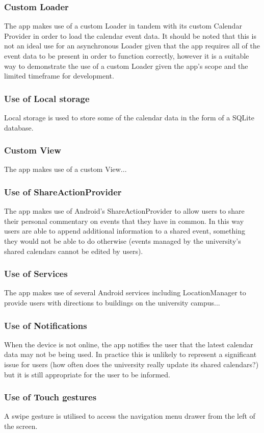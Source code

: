 \documentclass{article}
\begin{document}
\subsubsection{Custom Loader}
The app makes use of a custom Loader in tandem with its custom Calendar Provider in order to load the calendar event data. It should be noted that this is not an ideal use for an asynchronous Loader given that the app requires all of the event data to be present in order to function correctly, however it is a suitable way to demonstrate the use of a custom Loader given the app's scope and the limited timeframe for development.
\subsubsection{Use of Local storage}
Local storage is used to store some of the calendar data in the form of a SQLite database.
\subsubsection{Custom View}
The app makes use of a custom View...
\subsubsection{Use of ShareActionProvider}
The app makes use of Android's ShareActionProvider to allow users to share their personal commentary on events that they have in common. In this way users are able to append additional information to a shared event, something they would not be able to do otherwise (events managed by the university's shared calendars cannot be edited by users).
\subsubsection{Use of Services}
The app makes use of several Android services including LocationManager to provide users with directions to buildings on the university campus... 
\subsubsection{Use of Notifications}
When the device is not online, the app notifies the user that the latest calendar data may not be being used. In practice this is unlikely to represent a significant issue for users (how often does the university really update its shared calendars?) but it is still appropriate for the user to be informed.
\subsubsection{Use of Touch gestures}
A swipe gesture is utilised to access the navigation menu drawer from the left of the screen.
\end{document}
